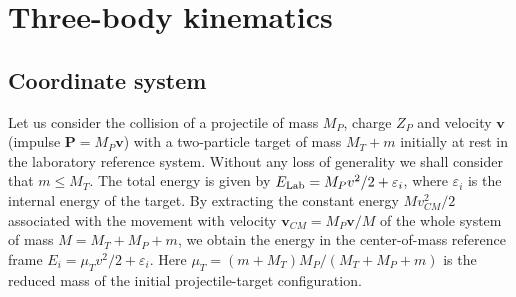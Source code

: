 \chapter{Three-body kinematics}

\section{Coordinate system}
\label{S:coord-syste}


Let us consider the collision of a projectile of mass $M_P$, charge $Z_P$ and velocity $\bm{v}$ (impulse $\bm{P} = M_P \bm{v}$) with a two-particle target of mass $M_T + m$ initially at rest in the laboratory reference system. Without any loss of generality we shall consider that $m \leq M_T$. The total energy is given by $E_{\rm Lab} = M_P v^2 / 2 + \varepsilon_i$, where $\varepsilon_i$ is the internal energy of the target. By extracting the constant energy $M v_{CM}^2 / 2$ associated with the movement with velocity $\bm{v}_{CM} = M_P \bm{v} / M$ of the whole system of mass $M = M_T + M_P + m$, we obtain the energy in the center-of-mass reference frame $E_i = \mu_T v^2 / 2 + \varepsilon_i$. Here $\mu_T = (m + M_T) M_P / (M_T + M_P + m)$ is the reduced mass of the initial projectile-target configuration.

